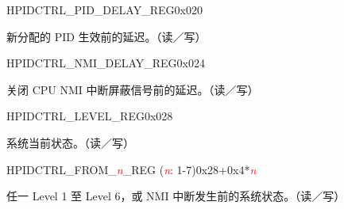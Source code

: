     
    \begin{register}{H}{PIDCTRL\_PID\_DELAY\_REG}{0x020}\label{regdesc:PIDCTRLPIDDELAYREG}
    \regnewline%
    \begin{regdesc}\begin{reglist}
    \item [PIDCTRL\_PID\_DELAY]新分配的 PID 生效前的延迟。（读／写）
    \end{reglist}\end{regdesc}
    \end{register}
    
    
    \begin{register}{H}{PIDCTRL\_NMI\_DELAY\_REG}{0x024}\label{regdesc:PIDCTRLNMIDELAYREG}
    \regnewline%
    \begin{regdesc}\begin{reglist}
    \item [PIDCTRL\_NMI\_DELAY]关闭 CPU NMI 中断屏蔽信号前的延迟。（读／写）
    \end{reglist}\end{regdesc}
    \end{register}
    
    
    \begin{register}{H}{PIDCTRL\_LEVEL\_REG}{0x028}\label{regdesc:PIDCTRLLEVELREG}
    \regnewline%
    \begin{regdesc}\begin{reglist}
    \item [PIDCTRL\_CURRENT\_STATUS] 系统当前状态。（读／写）
    \end{reglist}\end{regdesc}
    \end{register}
    
    
    \begin{register}{H}{PIDCTRL\_FROM\_\textcolor{red}{\it{n}}\_REG (\textcolor{red}{\it{n}}: 1-7)}{0x28+0x4*\textcolor{red}{\it{n}}}\label{regdesc:PIDCTRLFROMnREG}
    \regnewline%
    \begin{regdesc}\begin{reglist}
    \item [PIDCTRL\_PREVIOUS\_STATUS\_\textcolor{red}{\it{n}}] 任一 Level 1 至 Level 6，或 NMI 中断发生前的系统状态。（读／写）
    \end{reglist}\end{regdesc}
    \end{register}
    
